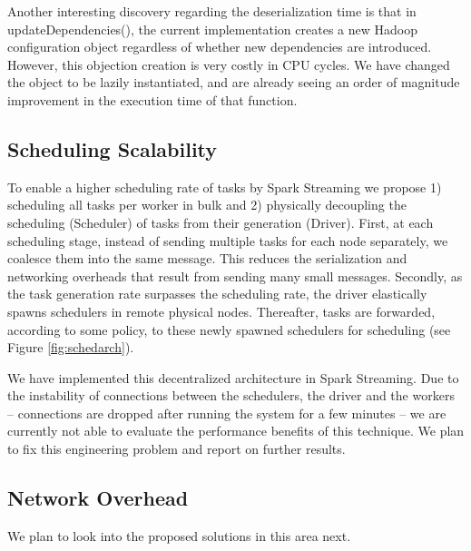 Another interesting discovery regarding the deserialization time is that in updateDependencies(), the current implementation creates a new Hadoop configuration object regardless of whether new dependencies are introduced. However, this objection creation is very costly in CPU cycles. We have changed the object to be lazily instantiated, and are already seeing an order of magnitude improvement in the execution time of that function.


\subsection{Scheduling Scalability}


To enable a higher scheduling rate of tasks by Spark Streaming we propose 1) scheduling all tasks per worker in bulk and 2) physically decoupling the scheduling (Scheduler) of tasks from their generation (Driver).
First, at each scheduling stage, instead of sending multiple tasks for each node separately, we coalesce them into the same message. This reduces the serialization and networking overheads that result from sending many small messages.
Secondly, as the task generation rate surpasses the scheduling rate, the driver elastically spawns schedulers in remote physical nodes. Thereafter, tasks are forwarded, according to some policy, to these newly spawned schedulers for scheduling (see Figure \ref{fig:schedarch}). 

We have implemented this decentralized architecture in Spark Streaming. Due to the instability of connections between the schedulers, the driver and the workers -- connections are dropped after running the system for a few minutes -- we are currently not able to evaluate the performance benefits of this technique. We plan to fix this engineering problem and report on further results.


\subsection{Network Overhead}
We plan to look into the proposed solutions in this area next.
